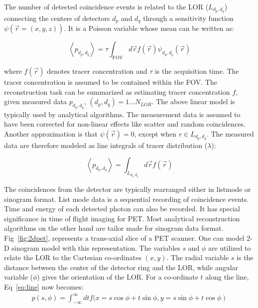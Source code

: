  The number of detected coincidence events is related to the \ac{LOR} ($L_{d_{p},d_{q}}$) connecting the centers of detectors $d_p$ and $d_q$ through a sensitivity function $\psi(\vec{r}=(x,y,z))$. It is a Poisson variable whose mean can be written as:

\begin{equation}\label{eq:analy}
\left\langle p_{d_{p},d_{q}}\right\rangle=\tau \int_{\mathrm{FOV}} d \vec{r} f(\vec{r}) \psi_{d_{p}, d_{q}}(\vec{r})
\end{equation}

where $f(\vec{r})$ denotes tracer concentration and $\tau$ is the acquisition time. The tracer concentration is assumed to be contained within the \ac{FOV}. The reconstruction task can be summarized as estimating tracer concentration $f$, given measured data $p_{d_{p},d_{q}}$, $(d_{p},d_{q})=1\dots N_{LOR}$. The above linear model is typically used by analytical algorithms. The measurement data is assumed to have been corrected for non-linear effects like scatter and random coincidences. Another approximation is that $\psi(\vec{r})=0$, except when $r\in L_{d_{p},d_{q}} $. The measured data are therefore modeled as line integrals of tracer distribution ($\lambda$): 

\begin{equation}
\label{eq:line}
\left\langle p_{d_{p}, d_{q}}\right\rangle=\int_{L_{d_{p}, d_{q}}} d \vec{r} f(\vec{r})
\end{equation}

The coincidences from the detector are typically rearranged either in listmode or sinogram format. List mode data is a sequential recording of coincidence events. Time and energy of each detected photon can also be recorded. It has special significance in time of flight imaging for \ac{PET}. Most analytical reconstruction algorithms on the other hand are tailor made for sinogram data format. Fig~\ref{fig:2dpet}, represents a trans-axial slice of a \ac{PET} scanner. One can model 2-D sinogram model with this representation. The variables $s$ and $\phi$ are utilized to relate the \ac{LOR} to the Cartesian co-ordinates $(x,y)$. The radial variable $s$ is the distance between the center of the detector ring and the \ac{LOR}, while angular variable ($\phi$) gives the orientation of the \ac{LOR}. 
For a co-ordinate $t$ along the line, Eq~\ref{eq:line} now becomes:
\begin{equation}\label{eq:line_sino}
\begin{array}{c}
p\left(s, \phi\right)=\int_{-\infty}^{\infty} d t f(x= s \cos\phi +t \sin \phi, 
\left.y=s \sin \phi + t \cos \phi\right)
\end{array}
\end{equation}

